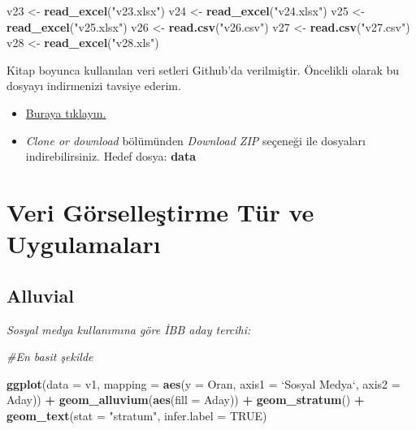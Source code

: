 \documentclass[
]{book}
\newenvironment{Shaded}{\begin{snugshade}}{\end{snugshade}}
\newcommand{\CommentTok}[1]{\textcolor[rgb]{0.56,0.35,0.01}{\textit{#1}}}
\newcommand{\DataTypeTok}[1]{\textcolor[rgb]{0.13,0.29,0.53}{#1}}
\newcommand{\KeywordTok}[1]{\textcolor[rgb]{0.13,0.29,0.53}{\textbf{#1}}}
\newcommand{\NormalTok}[1]{#1}
\newcommand{\OperatorTok}[1]{\textcolor[rgb]{0.81,0.36,0.00}{\textbf{#1}}}
\newcommand{\OtherTok}[1]{\textcolor[rgb]{0.56,0.35,0.01}{#1}}
\newcommand{\StringTok}[1]{\textcolor[rgb]{0.31,0.60,0.02}{#1}}
\begin{document}
\begin{Shaded}
\begin{Highlighting}[]
\NormalTok{v23 <-}\StringTok{ }\KeywordTok{read_excel}\NormalTok{(}\StringTok{"v23.xlsx"}\NormalTok{)}
\NormalTok{v24 <-}\StringTok{ }\KeywordTok{read_excel}\NormalTok{(}\StringTok{"v24.xlsx"}\NormalTok{)}
\NormalTok{v25 <-}\StringTok{ }\KeywordTok{read_excel}\NormalTok{(}\StringTok{"v25.xlsx"}\NormalTok{)}
\NormalTok{v26 <-}\StringTok{ }\KeywordTok{read.csv}\NormalTok{(}\StringTok{"v26.csv"}\NormalTok{)}
\NormalTok{v27 <-}\StringTok{ }\KeywordTok{read.csv}\NormalTok{(}\StringTok{"v27.csv"}\NormalTok{)}
\NormalTok{v28 <-}\StringTok{ }\KeywordTok{read_excel}\NormalTok{(}\StringTok{"v28.xls"}\NormalTok{)}
\end{Highlighting}
\end{Shaded}

Kitap boyunca kullanılan veri setleri Github'da verilmiştir. Öncelikli olarak bu dosyayı indirmenizi tavsiye ederim.

\begin{itemize}
\item
  \href{https://github.com/rpydaneogrendim/rViz}{Buraya tıklayın.}
\item
  \emph{Clone or download} bölümünden \emph{Download ZIP} seçeneği ile dosyaları indirebilirsiniz. Hedef dosya: \textbf{data}
\end{itemize}

\hypertarget{veri-guxf6rselleux15ftirme-tuxfcr-ve-uygulamalarux131}{%
\chapter{Veri Görselleştirme Tür ve Uygulamaları}\label{veri-guxf6rselleux15ftirme-tuxfcr-ve-uygulamalarux131}}

\hypertarget{alluvial}{%
\section{Alluvial}\label{alluvial}}

\emph{Sosyal medya kullanımına göre İBB aday tercihi:}

\begin{Shaded}
\begin{Highlighting}[]
\CommentTok{#En basit şekilde}

\KeywordTok{ggplot}\NormalTok{(}\DataTypeTok{data =}\NormalTok{ v1, }\DataTypeTok{mapping =} \KeywordTok{aes}\NormalTok{(}\DataTypeTok{y =}\NormalTok{ Oran, }\DataTypeTok{axis1 =} \StringTok{`}\DataTypeTok{Sosyal Medya}\StringTok{`}\NormalTok{, }\DataTypeTok{axis2 =}\NormalTok{ Aday)) }\OperatorTok{+}
\StringTok{  }\KeywordTok{geom_alluvium}\NormalTok{(}\KeywordTok{aes}\NormalTok{(}\DataTypeTok{fill =}\NormalTok{ Aday)) }\OperatorTok{+}
\StringTok{  }\KeywordTok{geom_stratum}\NormalTok{() }\OperatorTok{+}
\StringTok{  }\KeywordTok{geom_text}\NormalTok{(}\DataTypeTok{stat =} \StringTok{"stratum"}\NormalTok{, }\DataTypeTok{infer.label =} \OtherTok{TRUE}\NormalTok{)}
\end{Highlighting}
\end{Shaded}
\end{document}
